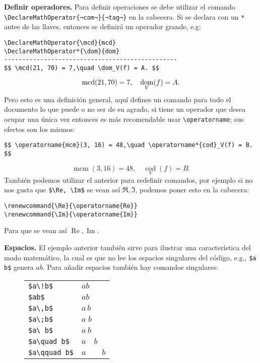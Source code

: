 \textbf{Definir operadores.} Para definir operaciones se debe utilizar el comando \lstinline|\DeclareMathOperator{¬com¬}{¬tag¬}| en la cabecera. Si se declara con un \texttt{*} antes de las llaves, entonces se definirá un operador grande, e.g:
\begin{lstlisting}
\DeclareMathOperator{\mcd}{mcd}
\DeclareMathOperator*{\dom}{dom}
------------------------------------------------
$$ \mcd(21, 70) = 7,\quad \dom_V(f) = A. $$
\end{lstlisting}
$$ \mcd(21, 70) = 7,\quad \dom_V(f) = A. $$
Pero esto es una definición general, aquí defines un comando para todo el documento lo que puede o no ser de su agrado, si tiene un operador que desea ocupar una única vez entonces es más recomendable usar \lstinline|\operatorname|; sus efectos son los mismos:
\begin{lstlisting}
$$ \operatorname{mcm}(3, 16) = 48,\quad \operatorname*{cod}_V(f) = B. $$
\end{lstlisting}
$$ \operatorname{mcm}(3, 16) = 48,\quad \operatorname*{cod}_V(f) = B. $$
También podemos utilizar el anterior para redefinir comandos, por ejemplo si no nos gusta que \lstinline|$\Re, \Im$| se vean así $\Re, \Im$, podemos poner esto en la cabecera:
\begin{lstlisting}
\renewcommand{\Re}{\operatorname{Re}}
\renewcommand{\Im}{\operatorname{Im}}
\end{lstlisting}
Para que se vean así $\operatorname{Re}, \operatorname{Im}$.

\textbf{Espacios.} El ejemplo anterior también sirve para ilustrar una característica del modo matemático, la cual es que no lee los espacios singulares del código, e.g., \lstinline|$a     b$| genera $a     b$. Para añadir espacios también hay comandos singulares:
\begin{figure}[!h]
	\centering
	\begin{longtable}{ll}
		\hline \hline
		\endhead
		\hline \hline
		\endfoot

		\lstinline|$a\!b$|      & $a\!b$ \\
		\lstinline|$ab$|        & $ab$ \\
		\lstinline|$a\,b$|      & $a\,b$ \\
		\lstinline|$a\;b$|      & $a\;b$ \\
		\lstinline|$a\ b$|      & $a\ b$ \\
		\lstinline|$a\quad b$|  & $a\quad b$ \\
		\lstinline|$a\qquad b$| & $a\qquad b$ \\
	\end{longtable}
\end{figure}

